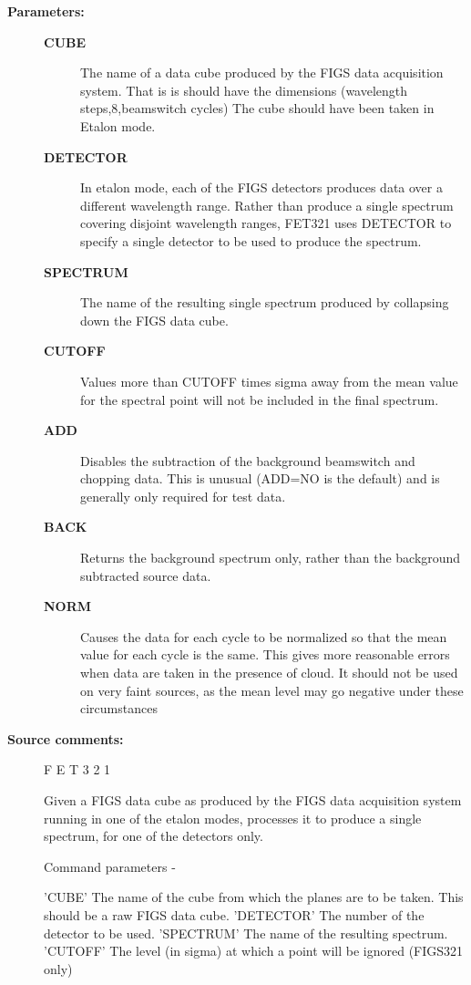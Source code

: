 \begin{description}
\begin{description}
\item [\textbf{Parameters:}]
\begin{description}
\item [\textbf{CUBE}]
 The name of a data cube produced by the FIGS data
 acquisition system.  That is is should have the
 dimensions (wavelength steps,8,beamswitch cycles)
 The cube should have been taken in Etalon mode.
\item [\textbf{DETECTOR}]
 In etalon mode, each of the FIGS detectors produces
 data over a different wavelength range.  Rather than
 produce a single spectrum covering disjoint wavelength
 ranges, FET321 uses DETECTOR to specify a single detector
 to be used to produce the spectrum.
\item [\textbf{SPECTRUM}]
 The name of the resulting single spectrum
 produced by collapsing down the FIGS data cube.
\item [\textbf{CUTOFF}]
 Values more than CUTOFF times sigma away from the mean
 value for the spectral point will not be included in
 the final spectrum.
\item [\textbf{ADD}]
 Disables the subtraction of the background beamswitch
 and chopping data.  This is unusual (ADD=NO is the
 default) and is generally only required for test data.
\item [\textbf{BACK}]
 Returns the background spectrum only, rather than the
 background subtracted source data.
\item [\textbf{NORM}]
 Causes the data for each cycle to be normalized so that
 the mean value for each cycle is the same. This gives more
 reasonable errors when data are taken in the presence of
 cloud. It should not be used on very faint sources, as the
 mean level may go negative under these circumstances
\end{description}

\item [\textbf{Source comments:}]
\begin{terminalv}
 F E T 3 2 1

 Given a FIGS data cube as produced by the FIGS data acquisition
 system running in one of the etalon modes, processes it to produce
 a single spectrum, for one of the detectors only.

 Command parameters -

 'CUBE'     The name of the cube from which the planes
            are to be taken.  This should be a raw FIGS data
            cube.
 'DETECTOR' The number of the detector to be used.
 'SPECTRUM' The name of the resulting spectrum.
 'CUTOFF'   The level (in sigma) at which a point will
            be ignored (FIGS321 only)


\end{terminalv}
\end{description}
\end{description}
